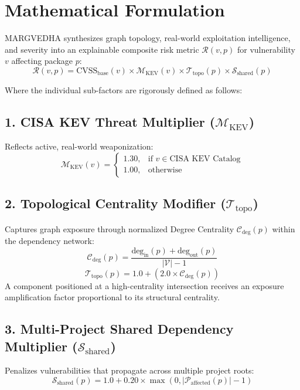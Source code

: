 \documentclass[12pt,a4paper,oneside]{report}
\begin{document}
\section{Mathematical Formulation}
MARGVEDHA synthesizes graph topology, real-world exploitation intelligence, and severity into an explainable composite risk metric $\mathcal{R}(v, p)$ for vulnerability $v$ affecting package $p$:
\begin{equation}
    \mathcal{R}(v, p) = \text{CVSS}_{\text{base}}(v) \times \mathcal{M}_{\text{KEV}}(v) \times \mathcal{T}_{\text{topo}}(p) \times \mathcal{S}_{\text{shared}}(p)
\end{equation}

Where the individual sub-factors are rigorously defined as follows:

\subsection{1. CISA KEV Threat Multiplier ($\mathcal{M}_{\text{KEV}}$)}
Reflects active, real-world weaponization:
\begin{equation}
    \mathcal{M}_{\text{KEV}}(v) = 
    \begin{cases}
        1.30, & \text{if } v \in \text{CISA KEV Catalog} \\
        1.00, & \text{otherwise}
    \end{cases}
\end{equation}

\subsection{2. Topological Centrality Modifier ($\mathcal{T}_{\text{topo}}$)}
Captures graph exposure through normalized Degree Centrality $\mathcal{C}_{\text{deg}}(p)$ within the dependency network:
\begin{equation}
    \mathcal{C}_{\text{deg}}(p) = \frac{\text{deg}_{\text{in}}(p) + \text{deg}_{\text{out}}(p)}{|\mathcal{V}| - 1}
\end{equation}
\begin{equation}
    \mathcal{T}_{\text{topo}}(p) = 1.0 + \left(2.0 \times \mathcal{C}_{\text{deg}}(p)\right)
\end{equation}
A component positioned at a high-centrality intersection receives an exposure amplification factor proportional to its structural centrality.

\subsection{3. Multi-Project Shared Dependency Multiplier ($\mathcal{S}_{\text{shared}}$)}
Penalizes vulnerabilities that propagate across multiple project roots:
\begin{equation}
    \mathcal{S}_{\text{shared}}(p) = 1.0 + 0.20 \times \max\left(0, |\mathcal{P}_{\text{affected}}(p)| - 1\right)
\end{equation}
\end{document}
